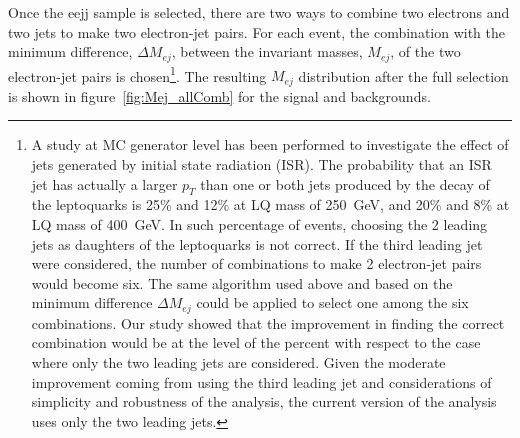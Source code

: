 %
Once the eejj sample is selected, there are two ways to combine two electrons and two jets to make two electron-jet pairs. 
For each event, the combination with the minimum difference, $\Delta M_{ej}$, between the invariant masses, $M_{ej}$, 
of the two electron-jet pairs is chosen\footnote{
A study at MC generator level has been performed to investigate the effect of jets generated by initial state 
radiation (ISR). The probability that an ISR jet has actually a larger $p_T$ than one or both jets produced 
by the decay of the leptoquarks is 25\% and 12\% at LQ mass of 250~GeV, and 20\% and 8\% at LQ mass of 400~GeV. 
In such percentage of events, choosing the 2 leading jets as daughters of the leptoquarks is not correct. 
If the third leading jet were considered, the number of combinations to make 2 electron-jet pairs would become six.
The same algorithm used above and based on the minimum difference $\Delta M_{ej}$ could be applied to select one 
among the six combinations. Our study showed that the improvement in finding the correct combination would be at the level
of the percent with respect to the case where only the two leading jets are considered.
Given the moderate improvement coming from using the third leading jet and considerations of simplicity and robustness
of the analysis, the current version of the analysis uses only the two leading jets.
}. 
The resulting $M_{ej}$ distribution after the full selection is shown in figure~\ref{fig:Mej_allComb} for the signal and backgrounds. 

